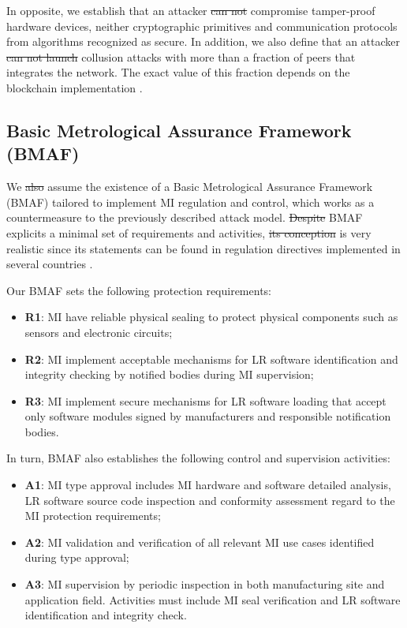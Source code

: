 \documentclass[journal]{IEEEtran} %
\providecommand{\DIFadd}[1]{{\protect\color{blue}\uwave{#1}}} %
\providecommand{\DIFdel}[1]{{\protect\color{red}\sout{#1}}}                      %
\providecommand{\DIFaddbegin}{} %
\providecommand{\DIFaddend}{} %
\providecommand{\DIFdelbegin}{} %
\providecommand{\DIFdelend}{} %
\begin{document}
In opposite, we establish that an attacker \DIFdelbegin \DIFdel{can not }\DIFdelend \DIFaddbegin \DIFadd{cannot }\DIFaddend compromise tamper-proof hardware devices, neither cryptographic primitives and communication protocols from algorithms recognized as secure. In addition, we also define that an attacker \DIFdelbegin \DIFdel{can not launch }\DIFdelend \DIFaddbegin \DIFadd{cannot take part of }\DIFaddend collusion attacks with more than a fraction of peers that integrates the network. The exact value of this fraction depends on the blockchain implementation \cite{Vukolic2016}. %

\subsection{Basic Metrological Assurance Framework (BMAF)}
We \DIFdelbegin \DIFdel{also }\DIFdelend assume the existence of a Basic Metrological Assurance Framework (BMAF) tailored to implement MI regulation and control, which works as a countermeasure to the  previously described attack model. \DIFdelbegin \DIFdel{Despite }\DIFdelend \DIFaddbegin \DIFadd{Such }\DIFaddend BMAF explicits a minimal set of requirements and activities, \DIFdelbegin \DIFdel{its conception }\DIFdelend \DIFaddbegin \DIFadd{which }\DIFaddend is very realistic since its statements can be found in regulation directives implemented in several countries \cite{Esche2015,Camara2012,Boccardo2014,Luchsinger2008}.

Our BMAF sets the following protection requirements:
 \begin{itemize} 
 \item \textbf{R1}: MI have reliable physical sealing to protect physical components such as sensors and electronic circuits;
 \item \textbf{R2}: MI implement acceptable mechanisms for LR software identification and integrity checking by notified bodies during MI supervision;
 \item \textbf{R3}: MI implement secure mechanisms for LR software loading that accept only software modules signed by manufacturers and responsible notification bodies.
 \end{itemize} 

In turn, BMAF also establishes the following control and supervision activities:
 \begin{itemize} 
 \item \textbf{A1}: MI type approval includes MI hardware and software detailed analysis, LR software source code inspection and conformity assessment regard to the MI protection requirements;
 \item \textbf{A2}: MI validation and verification of all relevant MI use cases identified during type approval;
 \item \textbf{A3}: MI supervision by periodic inspection in both manufacturing site and application field. Activities must include MI seal verification and LR software identification and integrity check.
 \end{itemize} 
\end{document}
